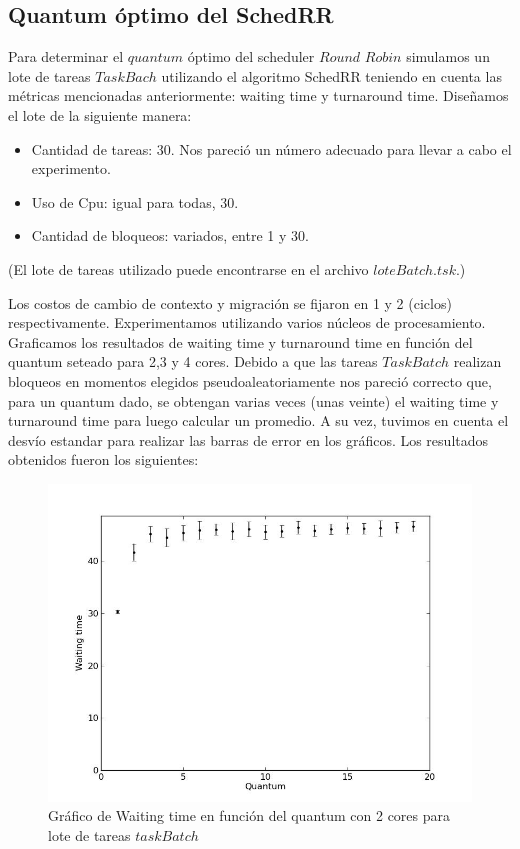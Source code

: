 \subsection{Quantum óptimo del SchedRR}

Para determinar el $quantum$ óptimo del scheduler $Round$ $Robin$ simulamos un lote de tareas $TaskBach$ utilizando el algoritmo SchedRR teniendo en cuenta las métricas mencionadas anteriormente: waiting time y turnaround time. Diseñamos el lote de la siguiente manera:
\begin{itemize}
	\item Cantidad de tareas: 30. Nos pareció un número adecuado para llevar a cabo el experimento.
	\item Uso de Cpu: igual para todas, 30.
	\item Cantidad de bloqueos: variados, entre 1 y 30.
\end{itemize}
(El lote de tareas utilizado puede encontrarse en el archivo $loteBatch.tsk$.)

Los costos de cambio de contexto y migración se fijaron en 1 y 2 (ciclos) respectivamente. Experimentamos utilizando varios núcleos de procesamiento.
Graficamos los resultados de waiting time y turnaround time en función del quantum seteado para 2,3 y 4 cores. Debido a que las tareas $TaskBatch$ realizan bloqueos en momentos elegidos pseudoaleatoriamente nos pareció correcto que, para un quantum dado, se obtengan varias veces (unas veinte) el waiting time y turnaround time para luego calcular un promedio. A su vez, tuvimos en cuenta el desvío estandar para realizar las barras de error en los gráficos. Los resultados obtenidos fueron los siguientes:

\begin{figure}[H]
	\begin{center}
		  \includegraphics[scale=0.3]{graficos/cores_2_wt.jpg}
		  \caption{Gráfico de Waiting time en función del quantum con 2 cores para lote de tareas $taskBatch$}
		  \label{fig:contra1}
	\end{center}
\end{figure}

